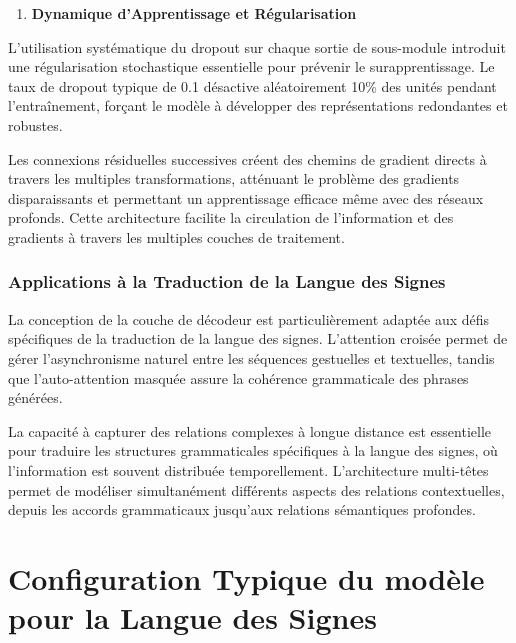 \documentclass[12pt]{article}
\providecommand{\tightlist}{%
      \setlength{\itemsep}{0pt}\setlength{\parskip}{0pt}}
\begin{document}
\begin{enumerate}
\def\labelenumi{\arabic{enumi}.}
\setcounter{enumi}{6}
\tightlist
\item
  \textbf{Dynamique d'Apprentissage et Régularisation}
\end{enumerate}

L'utilisation systématique du dropout sur chaque sortie de sous-module
introduit une régularisation stochastique essentielle pour prévenir le
surapprentissage. Le taux de dropout typique de 0.1 désactive
aléatoirement 10\% des unités pendant l'entraînement, forçant le modèle
à développer des représentations redondantes et robustes.

Les connexions résiduelles successives créent des chemins de gradient
directs à travers les multiples transformations, atténuant le problème
des gradients disparaissants et permettant un apprentissage efficace
même avec des réseaux profonds. Cette architecture facilite la
circulation de l'information et des gradients à travers les multiples
couches de traitement.

\subsubsection{Applications à la Traduction de la Langue des
Signes}\label{applications-uxe0-la-traduction-de-la-langue-des-signes}

La conception de la couche de décodeur est particulièrement adaptée aux
défis spécifiques de la traduction de la langue des signes. L'attention
croisée permet de gérer l'asynchronisme naturel entre les séquences
gestuelles et textuelles, tandis que l'auto-attention masquée assure la
cohérence grammaticale des phrases générées.

La capacité à capturer des relations complexes à longue distance est
essentielle pour traduire les structures grammaticales spécifiques à la
langue des signes, où l'information est souvent distribuée
temporellement. L'architecture multi-têtes permet de modéliser
simultanément différents aspects des relations contextuelles, depuis les
accords grammaticaux jusqu'aux relations sémantiques profondes.

    \section{Configuration Typique du modèle pour la Langue des
Signes}\label{configuration-typique-du-moduxe8le-pour-la-langue-des-signes}
\end{document}
